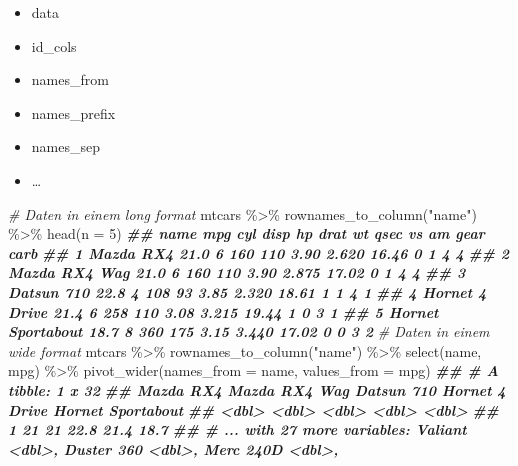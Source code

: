 \documentclass[
]{article}
\newenvironment{Shaded}{\begin{snugshade}}{\end{snugshade}}
\newcommand{\AttributeTok}[1]{\textcolor[rgb]{0.77,0.63,0.00}{#1}}
\newcommand{\CommentTok}[1]{\textcolor[rgb]{0.56,0.35,0.01}{\textit{#1}}}
\newcommand{\DecValTok}[1]{\textcolor[rgb]{0.00,0.00,0.81}{#1}}
\newcommand{\DocumentationTok}[1]{\textcolor[rgb]{0.56,0.35,0.01}{\textbf{\textit{#1}}}}
\newcommand{\FunctionTok}[1]{\textcolor[rgb]{0.00,0.00,0.00}{#1}}
\newcommand{\NormalTok}[1]{#1}
\newcommand{\SpecialCharTok}[1]{\textcolor[rgb]{0.00,0.00,0.00}{#1}}
\newcommand{\StringTok}[1]{\textcolor[rgb]{0.31,0.60,0.02}{#1}}
\providecommand{\tightlist}{%
  \setlength{\itemsep}{0pt}\setlength{\parskip}{0pt}}
\begin{document}
\begin{itemize}
\tightlist
\item
  data
\item
  id\_cols
\item
  names\_from
\item
  names\_prefix
\item
  names\_sep
\item
  \ldots{}
\end{itemize}

\begin{Shaded}
\begin{Highlighting}[]
\CommentTok{\# Daten in einem long format}
\NormalTok{mtcars }\SpecialCharTok{\%\textgreater{}\%}
  \FunctionTok{rownames\_to\_column}\NormalTok{(}\StringTok{"name"}\NormalTok{) }\SpecialCharTok{\%\textgreater{}\%}
  \FunctionTok{head}\NormalTok{(}\AttributeTok{n =} \DecValTok{5}\NormalTok{)}
\DocumentationTok{\#\#                name  mpg cyl disp  hp drat    wt  qsec vs am gear carb}
\DocumentationTok{\#\# 1         Mazda RX4 21.0   6  160 110 3.90 2.620 16.46  0  1    4    4}
\DocumentationTok{\#\# 2     Mazda RX4 Wag 21.0   6  160 110 3.90 2.875 17.02  0  1    4    4}
\DocumentationTok{\#\# 3        Datsun 710 22.8   4  108  93 3.85 2.320 18.61  1  1    4    1}
\DocumentationTok{\#\# 4    Hornet 4 Drive 21.4   6  258 110 3.08 3.215 19.44  1  0    3    1}
\DocumentationTok{\#\# 5 Hornet Sportabout 18.7   8  360 175 3.15 3.440 17.02  0  0    3    2}
\CommentTok{\# Daten in einem wide format}
\NormalTok{mtcars }\SpecialCharTok{\%\textgreater{}\%}
  \FunctionTok{rownames\_to\_column}\NormalTok{(}\StringTok{"name"}\NormalTok{) }\SpecialCharTok{\%\textgreater{}\%}
  \FunctionTok{select}\NormalTok{(name, mpg) }\SpecialCharTok{\%\textgreater{}\%}
  \FunctionTok{pivot\_wider}\NormalTok{(}\AttributeTok{names\_from =}\NormalTok{ name, }\AttributeTok{values\_from =}\NormalTok{ mpg)}
\DocumentationTok{\#\# \# A tibble: 1 x 32}
\DocumentationTok{\#\#   \textasciigrave{}Mazda RX4\textasciigrave{} \textasciigrave{}Mazda RX4 Wag\textasciigrave{} \textasciigrave{}Datsun 710\textasciigrave{} \textasciigrave{}Hornet 4 Drive\textasciigrave{} \textasciigrave{}Hornet Sportabout\textasciigrave{}}
\DocumentationTok{\#\#         \textless{}dbl\textgreater{}           \textless{}dbl\textgreater{}        \textless{}dbl\textgreater{}            \textless{}dbl\textgreater{}               \textless{}dbl\textgreater{}}
\DocumentationTok{\#\# 1          21              21         22.8             21.4                18.7}
\DocumentationTok{\#\# \# ... with 27 more variables: Valiant \textless{}dbl\textgreater{}, Duster 360 \textless{}dbl\textgreater{}, Merc 240D \textless{}dbl\textgreater{},}

\end{Highlighting}
\end{Shaded}
\end{document}
